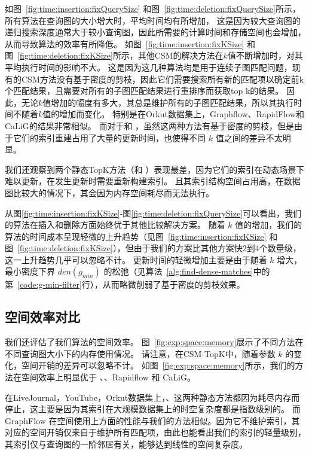 如图~\ref{fig:time:insertion:fixQuerySize} 和图~\ref{fig:time:deletion:fixQuerySize}所示，所有算法在查询图的大小增大时，平均时间均有所增加，
这是因为较大查询图的递归搜索深度通常大于较小查询图，因此所需要的计算时间和存储空间也会增加，从而导致算法的效率有所降低。
如图~\ref{fig:time:insertion:fixKSize} 和图~\ref{fig:time:deletion:fixKSize}所示，其他CSM的解决方法在$k$值不断增加时，对其平均执行时间的影响不大。
这是因为这几种算法均是用于连续子图匹配问题，现有的CSM方法没有基于密度的剪枝，因此它们需要搜索所有新的匹配项以确定前k个匹配结果，且需要对所有的子图匹配结果进行重排序而获取top k的结果。
因此，无论$k$值增加的幅度有多大，其总是维护所有的子图匹配结果，所以其执行时间不随着$k$值的增加而变化。
特别是在Orkut数据集上，Graphflow、RapidFlow和CaLiG的结果非常相似。
而对于\itk 和 \pm，虽然这两种方法有基于密度的剪枝，但是由于它们的索引重建占用了大量的更新时间，也使得不同 $k$ 值之间的差异不太明显。


我们还观察到两个静态TopK方法（\itk 和 \pm）表现最差，因为它们的索引在动态场景下难以更新，在发生更新时需要重新构建索引。
且其索引结构空间占用高，在数据图比较大的情况下，其会因为内存空间耗尽而无法执行。


从图\ref{fig:time:insertion:fixKSize}-图\ref{fig:time:deletion:fixQuerySize}可以看出，我们的算法在插入和删除方面始终优于其他比较解决方案。
随着 $k$ 值的增加，我们的算法的时间成本呈现轻微的上升趋势（见图~\ref{fig:time:insertion:fixKSize} 和图~\ref{fig:time:deletion:fixKSize}），但由于我们的方案比其他方案快2到4个数量级，这一上升趋势几乎可以忽略不计。
更新时间的轻微增加主要是由于随着 $k$ 增大，最小密度下界 $den(g_{min})$ 的松弛（见算法~\ref{alg:find-dense-matches}中的第~\ref{code:g-min-filter}行），从而略微削弱了基于密度的剪枝效果。


\subsection{空间效率对比}
\label{ch5:space}

我们还评估了我们算法的空间效率。
图~\ref{fig:exp:space:memory}展示了不同方法在不同查询图大小下的内存使用情况。
请注意，在CSM-TopK中，随着参数 $k$ 的变化，空间开销的差异可以忽略不计。
如图~\ref{fig:exp:space:memory}所示，我们的方法在空间效率上明显优于 \itk、\pm、Rapidflow 和 CaLiG。

在LiveJournal，YouTube，Orkut数据集上，\itk、\pm 这两种静态方法都因为耗尽内存而停止，这主要是因为其索引在大规模数据集上的时空复杂度都是指数级别的。
而GraphFlow 在空间使用上方面的性能与我们的方法相似。因为它不维护索引，其对应的空间开销仅来自于维护所有匹配项，由此也能看出我们的索引的轻量级别，其索引仅与查询图的一阶邻居有关，能够达到线性的空间复杂度。


